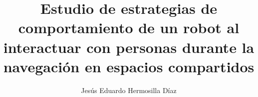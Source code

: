 \title{Estudio de estrategias de comportamiento de un robot al interactuar con personas durante la navegación en espacios compartidos}


\author{Jesús Eduardo Hermosilla Díaz}




     


\renewcommand{\submissiontext}{Reporte de avances de seminario de investigación}



